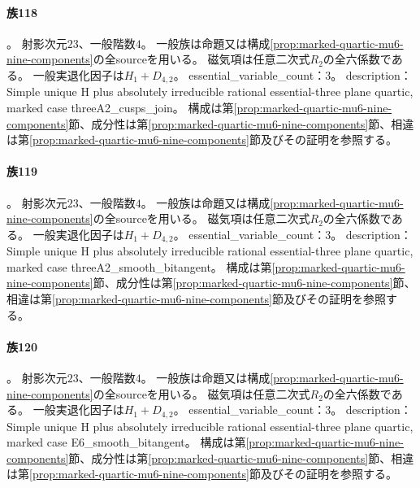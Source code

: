 \paragraph{族118}\label{catalogue:R4_MARKED_QUARTIC_MU6_THREEA2_CUSPS_JOIN_23}
。
射影次元$23$、一般階数$4$。
一般族は命題又は構成\ref{prop:marked-quartic-mu6-nine-components}の全sourceを用いる。
磁気項は任意二次式$R_2$の全六係数である。
一般実退化因子は$H_{1}+D_{4,2}$。
essential\_variable\_count：3。
description：Simple unique H plus absolutely irreducible rational essential-three plane quartic, marked case threeA2\_cusps\_join。
構成は第\ref{prop:marked-quartic-mu6-nine-components}節、成分性は第\ref{prop:marked-quartic-mu6-nine-components}節、相違は第\ref{prop:marked-quartic-mu6-nine-components}節及びその証明を参照する。

\paragraph{族119}\label{catalogue:R4_MARKED_QUARTIC_MU6_THREEA2_SMOOTH_BITANGENT_23}
。
射影次元$23$、一般階数$4$。
一般族は命題又は構成\ref{prop:marked-quartic-mu6-nine-components}の全sourceを用いる。
磁気項は任意二次式$R_2$の全六係数である。
一般実退化因子は$H_{1}+D_{4,2}$。
essential\_variable\_count：3。
description：Simple unique H plus absolutely irreducible rational essential-three plane quartic, marked case threeA2\_smooth\_bitangent。
構成は第\ref{prop:marked-quartic-mu6-nine-components}節、成分性は第\ref{prop:marked-quartic-mu6-nine-components}節、相違は第\ref{prop:marked-quartic-mu6-nine-components}節及びその証明を参照する。

\paragraph{族120}\label{catalogue:R4_MARKED_QUARTIC_MU6_E6_SMOOTH_BITANGENT_23}
。
射影次元$23$、一般階数$4$。
一般族は命題又は構成\ref{prop:marked-quartic-mu6-nine-components}の全sourceを用いる。
磁気項は任意二次式$R_2$の全六係数である。
一般実退化因子は$H_{1}+D_{4,2}$。
essential\_variable\_count：3。
description：Simple unique H plus absolutely irreducible rational essential-three plane quartic, marked case E6\_smooth\_bitangent。
構成は第\ref{prop:marked-quartic-mu6-nine-components}節、成分性は第\ref{prop:marked-quartic-mu6-nine-components}節、相違は第\ref{prop:marked-quartic-mu6-nine-components}節及びその証明を参照する。

